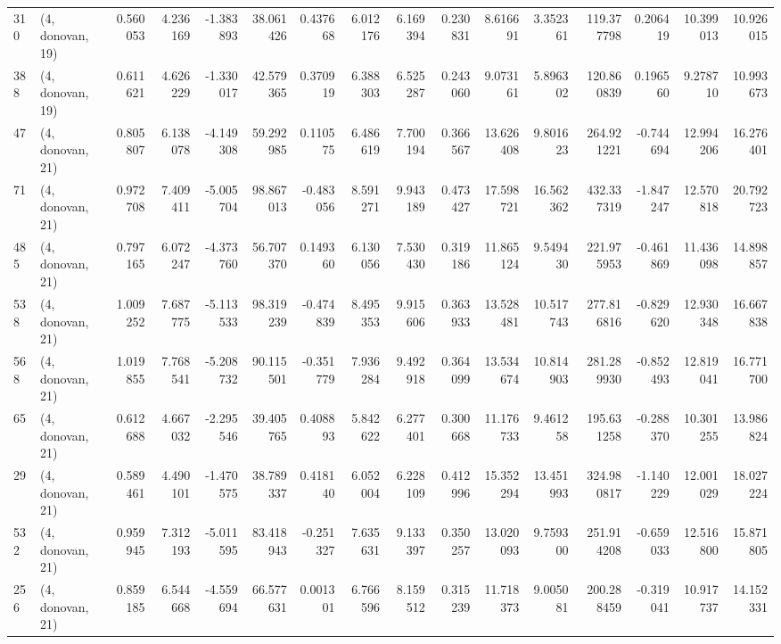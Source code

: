\begin{tabular}{llrrrrrrrrrrrrrr}
310 &  (4, donovan, 19) &   0.560053 &   4.236169 &  -1.383893 &    38.061426 &   0.437668 &   6.012176 &   6.169394 &  0.230831 &   8.616691 &   3.352361 &   119.377798 &  0.206419 &  10.399013 &  10.926015 \\
388 &  (4, donovan, 19) &   0.611621 &   4.626229 &  -1.330017 &    42.579365 &   0.370919 &   6.388303 &   6.525287 &  0.243060 &   9.073161 &   5.896302 &   120.860839 &  0.196560 &   9.278710 &  10.993673 \\
47  &  (4, donovan, 21) &   0.805807 &   6.138078 &  -4.149308 &    59.292985 &   0.110575 &   6.486619 &   7.700194 &  0.366567 &  13.626408 &   9.801623 &   264.921221 & -0.744694 &  12.994206 &  16.276401 \\
71  &  (4, donovan, 21) &   0.972708 &   7.409411 &  -5.005704 &    98.867013 &  -0.483056 &   8.591271 &   9.943189 &  0.473427 &  17.598721 &  16.562362 &   432.337319 & -1.847247 &  12.570818 &  20.792723 \\
485 &  (4, donovan, 21) &   0.797165 &   6.072247 &  -4.373760 &    56.707370 &   0.149360 &   6.130056 &   7.530430 &  0.319186 &  11.865124 &   9.549430 &   221.975953 & -0.461869 &  11.436098 &  14.898857 \\
538 &  (4, donovan, 21) &   1.009252 &   7.687775 &  -5.113533 &    98.319239 &  -0.474839 &   8.495353 &   9.915606 &  0.363933 &  13.528481 &  10.517743 &   277.816816 & -0.829620 &  12.930348 &  16.667838 \\
568 &  (4, donovan, 21) &   1.019855 &   7.768541 &  -5.208732 &    90.115501 &  -0.351779 &   7.936284 &   9.492918 &  0.364099 &  13.534674 &  10.814903 &   281.289930 & -0.852493 &  12.819041 &  16.771700 \\
65  &  (4, donovan, 21) &   0.612688 &   4.667032 &  -2.295546 &    39.405765 &   0.408893 &   5.842622 &   6.277401 &  0.300668 &  11.176733 &   9.461258 &   195.631258 & -0.288370 &  10.301255 &  13.986824 \\
29  &  (4, donovan, 21) &   0.589461 &   4.490101 &  -1.470575 &    38.789337 &   0.418140 &   6.052004 &   6.228109 &  0.412996 &  15.352294 &  13.451993 &   324.980817 & -1.140229 &  12.001029 &  18.027224 \\
532 &  (4, donovan, 21) &   0.959945 &   7.312193 &  -5.011595 &    83.418943 &  -0.251327 &   7.635631 &   9.133397 &  0.350257 &  13.020093 &   9.759300 &   251.914208 & -0.659033 &  12.516800 &  15.871805 \\
256 &  (4, donovan, 21) &   0.859185 &   6.544668 &  -4.559694 &    66.577631 &   0.001301 &   6.766596 &   8.159512 &  0.315239 &  11.718373 &   9.005081 &   200.288459 & -0.319041 &  10.917737 &  14.152331 \\

\end{tabular}

